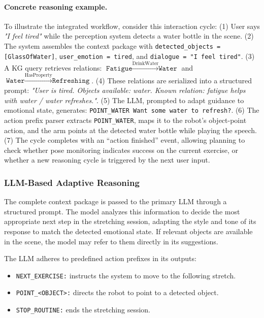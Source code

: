 \documentclass[pdflatex,sn-basic,Numbered,iicol,twocolumn]{sn-jnl}%
\begin{document}
\paragraph{Concrete reasoning example.}
To illustrate the integrated workflow, consider this interaction cycle: (1) User says \textit{"I feel tired"} while the perception system detects a water bottle in the scene. (2) The system assembles the context package with \texttt{detected\_objects = [\texttt{GlassOfWater}]}, \texttt{user\_emotion = tired}, and \texttt{dialogue = "I feel tired"}. (3) A KG query retrieves relations: $\texttt{Fatigue} \xrightarrow{\text{DrinkWater}} \texttt{Water}$ and $\texttt{Water} \xrightarrow{\text{HasProperty}} \texttt{Refreshing}$. (4) These relations are serialized into a structured prompt: \textit{"User is tired. Objects available: water. Known relation: fatigue helps with water / water refreshes."}. (5) The LLM, prompted to adapt guidance to emotional state, generates: \texttt{POINT\_WATER Want some water to refresh?}. (6) The action prefix parser extracts \texttt{POINT\_WATER}, maps it to the robot's object-point action, and the arm points at the detected water bottle while playing the speech. (7) The cycle completes with an ``action finished'' event, allowing planning to check whether pose monitoring indicates success on the current exercise, or whether a new reasoning cycle is triggered by the next user input.

\subsubsection{LLM-Based Adaptive Reasoning}

The complete context package is passed to the primary LLM through a structured prompt. The model analyzes this information to decide the most appropriate next step in the stretching session, adapting the style and tone of its response to match the detected emotional state. If relevant objects are available in the scene, the model may refer to them directly in its suggestions.

The LLM adheres to predefined action prefixes in its outputs:
\begin{itemize}
\item \texttt{NEXT\_EXERCISE:} instructs the system to move to the following stretch.
\item \texttt{POINT\_<OBJECT>:} directs the robot to point to a detected object.
\item \texttt{STOP\_ROUTINE:} ends the stretching session.
\end{itemize}
\end{document}
